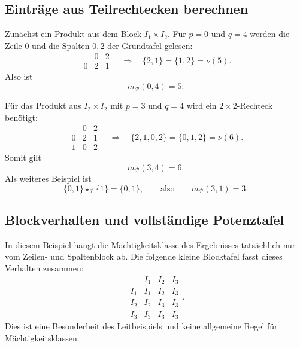 \documentclass[main.tex]{subfiles}
\begin{document}
\subsection{Einträge aus Teilrechtecken berechnen}

Zunächst ein Produkt aus dem Block \(I_1\times I_2\).  Für \(p=0\) und
\(q=4\) werden die Zeile \(0\) und die Spalten \(0,2\) der Grundtafel
gelesen:
\[
\begin{array}{c|cc}
&0&2\\\hline
0&2&1
\end{array}
\quad\Longrightarrow\quad
\{2,1\}=\{1,2\}=\nu(5).
\]
Also ist
\[
  m_{\mathcal P}(0,4)=5.
\]

Für das Produkt aus \(I_2\times I_2\) mit \(p=3\) und \(q=4\) wird ein
\(2\times2\)-Rechteck benötigt:
\[
\begin{array}{c|cc}
&0&2\\\hline
0&2&1\\
1&0&2
\end{array}
\quad\Longrightarrow\quad
\{2,1,0,2\}=\{0,1,2\}=\nu(6).
\]
Somit gilt
\[
  m_{\mathcal P}(3,4)=6.
\]
Als weiteres Beispiel ist
\[
  \{0,1\}\star_{\mathcal P}\{1\}=\{0,1\},
  \qquad\text{also}\qquad
  m_{\mathcal P}(3,1)=3.
\]

\subsection{Blockverhalten und vollständige Potenztafel}

In diesem Beispiel hängt die Mächtigkeitsklasse des Ergebnisses tatsächlich
nur vom Zeilen- und Spaltenblock ab.  Die folgende kleine Blocktafel fasst
dieses Verhalten zusammen:
\[
\begin{array}{c|ccc}
&I_1&I_2&I_3\\\hline
I_1&I_1&I_2&I_3\\
I_2&I_2&I_3&I_3\\
I_3&I_3&I_3&I_3
\end{array}.
\]
Dies ist eine Besonderheit des Leitbeispiels und keine allgemeine Regel für
Mächtigkeitsklassen.
\end{document}
